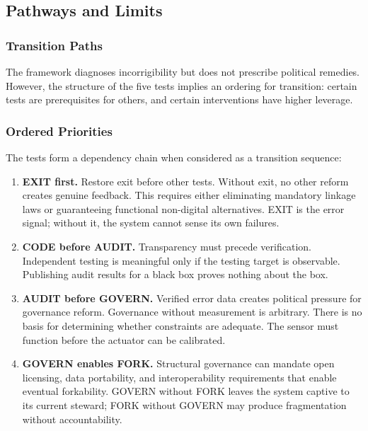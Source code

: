 \documentclass{article}
\begin{document}
\subsection{Pathways and Limits}
\label{subsec:pathways}

\subsubsection{Transition Paths}
\label{subsec:transition}

The framework diagnoses incorrigibility but does not prescribe political remedies. However, the structure of the five tests implies an ordering for transition: certain tests are prerequisites for others, and certain interventions have higher leverage.

\subsubsection{Ordered Priorities}

The tests form a dependency chain when considered as a transition sequence:

\begin{enumerate}
    \item \textbf{EXIT first.} Restore exit before other tests. Without exit, no other reform creates genuine feedback. This requires either eliminating mandatory linkage laws or guaranteeing functional non-digital alternatives. EXIT is the error signal; without it, the system cannot sense its own failures.

    \item \textbf{CODE before AUDIT.} Transparency must precede verification. Independent testing is meaningful only if the testing target is observable. Publishing audit results for a black box proves nothing about the box.

    \item \textbf{AUDIT before GOVERN.} Verified error data creates political pressure for governance reform. Governance without measurement is arbitrary. There is no basis for determining whether constraints are adequate. The sensor must function before the actuator can be calibrated.

    \item \textbf{GOVERN enables FORK.} Structural governance can mandate open licensing, data portability, and interoperability requirements that enable eventual forkability. GOVERN without FORK leaves the system captive to its current steward; FORK without GOVERN may produce fragmentation without accountability.
\end{enumerate}
\end{document}
